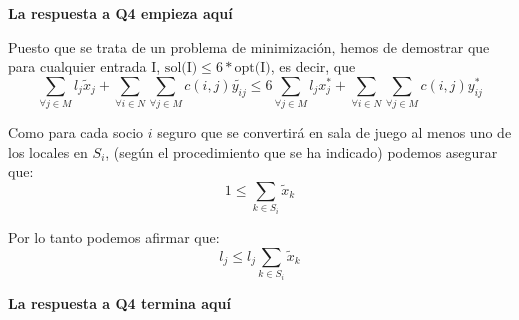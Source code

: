 

\textbf{La respuesta a Q4 empieza aquí}

Puesto que se trata de un problema de minimización, hemos de demostrar que
para cualquier entrada I, $\textrm{sol(I)} \leq 6*\textrm{opt(I)}$, es decir, que
\begin{equation}
 \sum_{\forall j \in M} l_j\tilde{x}_j + \sum_{\forall i \in N} \sum_{\forall j \in M} c(i,j)\tilde{y_{ij}}
  \leq 6\sum_{\forall j \in M} l_jx^*_j + \sum_{\forall i \in N} \sum_{\forall j \in M} c(i,j)y^*_{ij}
\end{equation}

Como para cada socio $i$ seguro que se convertirá en sala de juego al menos uno de los locales en $S_i$, (según el procedimiento que se ha indicado) podemos asegurar que:
\begin{equation}
1 \leq \sum_{k \in S_i} \tilde{x}_k
\end{equation}

Por lo tanto podemos afirmar que:
\begin{equation}
l_j \leq l_j\sum_{k \in S_i}\tilde{x}_k
\end{equation}

\textbf{La respuesta a Q4 termina aquí}
